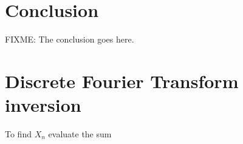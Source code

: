 \documentclass[12pt,journal,compsoc]{../ieeepaper/IEEEtran}
\begin{document}
\section{Conclusion}
FIXME: The conclusion goes here.





\appendices

\section{Discrete Fourier Transform inversion}
\label{appendix:discreteFourierInversion}

To find \( X_n \) evaluate the sum
\end{document}
